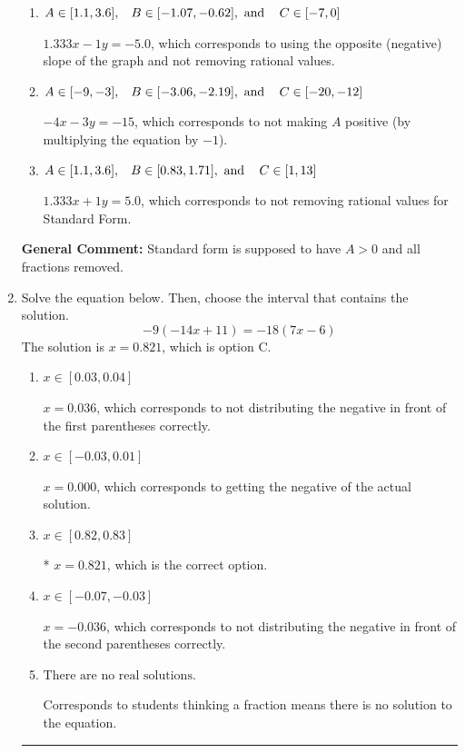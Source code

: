 \documentclass{extbook}[14pt]
\newcommand{\litem}[1]{\item #1

\rule{\textwidth}{0.4pt}}
\begin{document}
\begin{enumerate}
{\begin{enumerate}[label=\Alph*.]
* $4x + 3y = 15$, which is the correct option.
\item \( A \in [1.1, 3.6], \hspace{3mm} B \in [-1.07, -0.62], \text{ and } \hspace{3mm} C \in [-7, 0] \)

 $1.333x - 1y = -5.0$, which corresponds to using the opposite (negative) slope of the graph and not removing rational values.
\item \( A \in [-9, -3], \hspace{3mm} B \in [-3.06, -2.19], \text{ and } \hspace{3mm} C \in [-20, -12] \)

 $-4x - 3y = -15$, which corresponds to not making $A$ positive (by multiplying the equation by $-1$).
\item \( A \in [1.1, 3.6], \hspace{3mm} B \in [0.83, 1.71], \text{ and } \hspace{3mm} C \in [1, 13] \)

 $1.333x + 1y = 5.0$, which corresponds to not removing rational values for Standard Form.
\end{enumerate}

\textbf{General Comment:} Standard form is supposed to have $A > 0$ and all fractions removed.
}
\litem{
Solve the equation below. Then, choose the interval that contains the solution.
\[ -9(-14x + 11) = -18(7x -6) \]The solution is \( x = 0.821 \), which is option C.\begin{enumerate}[label=\Alph*.]
\item \( x \in [0.03, 0.04] \)

$x = 0.036$, which corresponds to not distributing the negative in front of the first parentheses correctly.
\item \( x \in [-0.03, 0.01] \)

$x = 0.000$, which corresponds to getting the negative of the actual solution.
\item \( x \in [0.82, 0.83] \)

* $x = 0.821$, which is the correct option.
\item \( x \in [-0.07, -0.03] \)

$x = -0.036$, which corresponds to not distributing the negative in front of the second parentheses correctly.
\item \( \text{There are no real solutions.} \)

Corresponds to students thinking a fraction means there is no solution to the equation.
\end{enumerate}

}
\end{enumerate}
\end{document}
